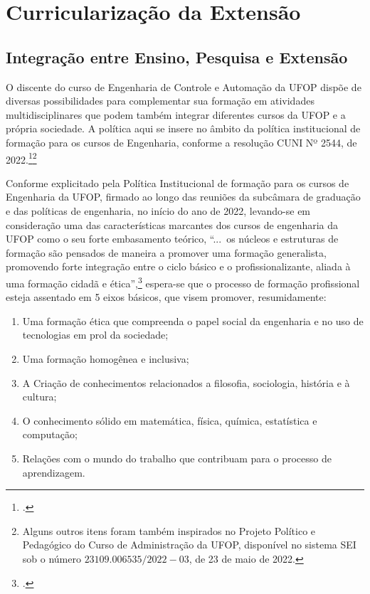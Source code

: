 \documentclass[
	12pt,				%
	openright,			%
	oneside,			%
	a4paper,			%
	english,			%
	brazil				%
	]{abntex2}
\begin{document}
\chapter{Curricularização da Extensão}

\section{Integração entre Ensino, Pesquisa e Extensão}

O discente do curso de Engenharia de Controle e Automação da UFOP dispõe de diversas possibilidades para complementar sua formação em atividades multidisciplinares que podem também integrar diferentes cursos da UFOP e a própria sociedade. A política aqui se insere no âmbito da política institucional de formação para os cursos de Engenharia, conforme a resolução CUNI Nº 2544, de 2022.\footcites[Em especial, podemos citar o trecho II da referida política, que englobam os chamados Núcleos e Estruturas de formação, bem como a questão da curricularização da extensão. Ver em][pp.~16--26]{politica-eng-2022-ufop}\footnote{Alguns outros itens foram também inspirados no Projeto Político e Pedagógico do Curso de Administração da UFOP, disponível no sistema SEI sob o número $23109.006535/2022-03$, de 23 de maio de 2022.}

Conforme explicitado pela Política Institucional de formação para os cursos de Engenharia da UFOP, firmado ao longo das reuniões da subcâmara de graduação e das políticas de engenharia, no início do ano de 2022, levando-se em consideração uma das características marcantes dos cursos de engenharia da UFOP como o seu forte embasamento teórico, ``...~os núcleos e estruturas de formação são pensados de maneira a promover uma formação generalista, promovendo forte integração entre o ciclo básico e o profissionalizante, aliada à uma formação cidadã e ética'',\footcite[p.~17]{politica-eng-2022-ufop} espera-se que o processo de formação profissional esteja assentado em 5 eixos básicos, que visem promover, resumidamente:
\begin{enumerate}
    \item Uma formação ética que compreenda o papel social da engenharia e no uso de tecnologias em prol da sociedade;
    \item Uma formação homogênea e inclusiva;
    \item A Criação de conhecimentos relacionados a filosofia, sociologia, história e à cultura;
    \item O conhecimento sólido em matemática, física, química, estatística e computação;
    \item Relações com o mundo do trabalho que contribuam para o processo de aprendizagem.
\end{enumerate}
\end{document}
